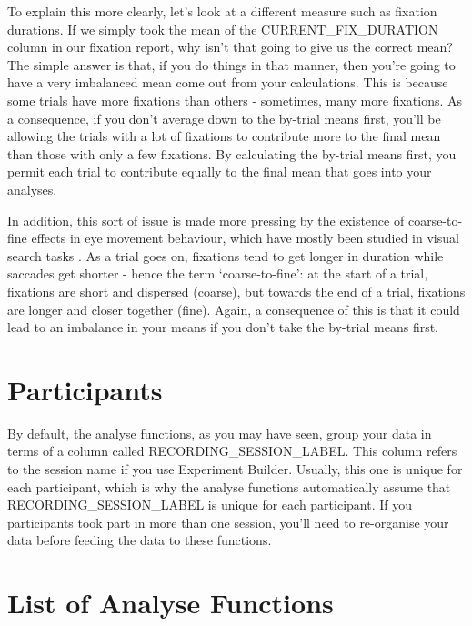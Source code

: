 \documentclass[]{book}
\begin{document}
To explain this more clearly, let's look at a different measure such as fixation durations. If we simply took the mean of the CURRENT\_FIX\_DURATION column in our fixation report, why isn't that going to give us the correct mean? The simple answer is that, if you do things in that manner, then you're going to have a very imbalanced mean come out from your calculations. This is because some trials have more fixations than others - sometimes, many more fixations. As a consequence, if you don't average down to the by-trial means first, you'll be allowing the trials with a lot of fixations to contribute more to the final mean than those with only a few fixations. By calculating the by-trial means first, you permit each trial to contribute equally to the final mean that goes into your analyses.

In addition, this sort of issue is made more pressing by the existence of coarse-to-fine effects in eye movement behaviour, which have mostly been studied in visual search tasks \citep{Godwin2014a, Over2007}. As a trial goes on, fixations tend to get longer in duration while saccades get shorter - hence the term `coarse-to-fine': at the start of a trial, fixations are short and dispersed (coarse), but towards the end of a trial, fixations are longer and closer together (fine). Again, a consequence of this is that it could lead to an imbalance in your means if you don't take the by-trial means first.

\hypertarget{participants}{%
\section{Participants}\label{participants}}

By default, the analyse functions, as you may have seen, group your data in terms of a column called RECORDING\_SESSION\_LABEL. This column refers to the session name if you use Experiment Builder. Usually, this one is unique for each participant, which is why the analyse functions automatically assume that RECORDING\_SESSION\_LABEL is unique for each participant. If you participants took part in more than one session, you'll need to re-organise your data before feeding the data to these functions.

\hypertarget{list-of-analyse-functions}{%
\section{List of Analyse Functions}\label{list-of-analyse-functions}}
\end{document}
